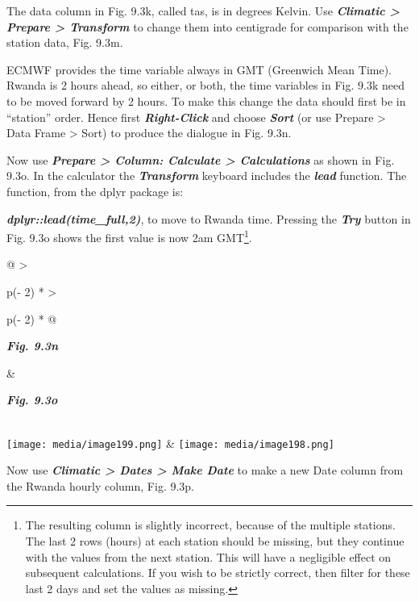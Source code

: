 \documentclass[
  letterpaper,
  DIV=11,
  numbers=noendperiod]{scrreprt}
\begin{document}
The data column in Fig. 9.3k, called tas, is in degrees Kelvin. Use
\textbf{\emph{Climatic \textgreater{} Prepare \textgreater{} Transform}}
to change them into centigrade for comparison with the station data,
Fig. 9.3m.

ECMWF provides the time variable always in GMT (Greenwich Mean Time).
Rwanda is 2 hours ahead, so either, or both, the time variables in Fig.
9.3k need to be moved forward by 2 hours. To make this change the data
should first be in ``station'' order. Hence first
\textbf{\emph{Right-Click}} and choose \textbf{\emph{Sort}} (or use
Prepare \textgreater{} Data Frame \textgreater{} Sort) to produce the
dialogue in Fig. 9.3n.

Now use \textbf{\emph{Prepare \textgreater{} Column: Calculate
\textgreater{} Calculations}} as shown in Fig. 9.3o. In the calculator
the \textbf{\emph{Transform}} keyboard includes the \textbf{\emph{lead}}
function. The function, from the dplyr package is:

\textbf{\emph{dplyr::lead(time\_full,2)}}, to move to Rwanda time.
Pressing the \textbf{\emph{Try}} button in Fig. 9.3o shows the first
value is now 2am GMT\footnote{The resulting column is slightly
  incorrect, because of the multiple stations. The last 2 rows (hours)
  at each station should be missing, but they continue with the values
  from the next station. This will have a negligible effect on
  subsequent calculations. If you wish to be strictly correct, then
  filter for these last 2 days and set the values as missing.}.

\begin{longtable}[]{@{}
  >{\raggedright\arraybackslash}p{(\columnwidth - 2\tabcolsep) * }
  >{\raggedright\arraybackslash}p{(\columnwidth - 2\tabcolsep) * }@{}}
\toprule\noalign{}
\begin{minipage}[b]{\linewidth}\raggedright
\textbf{\emph{Fig. 9.3n}}
\end{minipage} & \begin{minipage}[b]{\linewidth}\raggedright
\textbf{\emph{Fig. 9.3o}}
\end{minipage} \\
\midrule\noalign{}
\endhead
\bottomrule\noalign{}
\endlastfoot
\texttt{[image: media/image199.png]} &
\texttt{[image: media/image198.png]} \\
\end{longtable}

Now use \textbf{\emph{Climatic \textgreater{} Dates \textgreater{} Make
Date}} to make a new Date column from the Rwanda hourly column, Fig.
9.3p.
\end{document}
